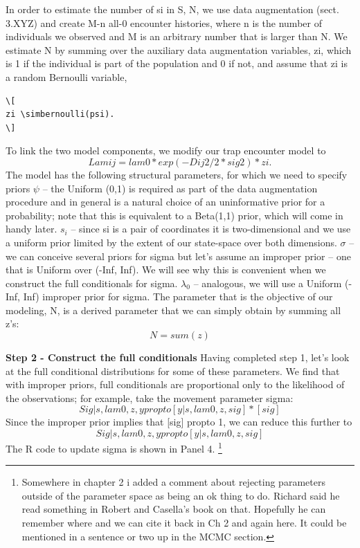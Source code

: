 In order to estimate the number of si in S, N, we use data augmentation (sect. 3.XYZ) and create M-n all-0 encounter histories, where n is the number of individuals we observed and M is an arbitrary number that is larger than N. We estimate N by summing over the auxiliary data augmentation variables, zi, which is 1 if the individual is part of the population and 0 if not, and assume that zi is a random Bernoulli variable,
\begin{verbatim}
\[
zi \simbernoulli(psi).
\]
\end{verbatim}

To link the two model components, we modify our trap encounter model to
\[
Lamij = lam0 * exp(-Dij2/2*sig2) * zi. 
\]
The model has the following structural parameters, for which we need to specify priors
$\psi$ – the Uniform (0,1) is required as part of the data augmentation procedure and in general is a natural choice of an uninformative prior for a probability; note that this is equivalent to a Beta(1,1) prior, which will come in handy later.
$s_{i}$ – since si is a pair of coordinates it is two-dimensional and we use a uniform prior limited by the extent of our state-space over both dimensions. 
$\sigma$ – we can conceive several priors for sigma but let's assume an improper prior – one that is Uniform over (-Inf, Inf). We will see why this is convenient when we construct the full conditionals for sigma.
$\lambda_{0}$ – analogous, we will use a Uniform (-Inf, Inf) improper prior for sigma.
The parameter that is the objective of our modeling, N, is a derived parameter that we can simply obtain by summing all z's:
\[
N=sum(z)
\]


{\bf Step 2 - Construct the full conditionals}
Having completed step 1, let's look at the full conditional distributions for some of these parameters.
We find that with improper priors, full conditionals are proportional only to the likelihood of the observations; for example, take the movement parameter sigma:
\[
Sig|s, lam0, z, y propto [y| s, lam0, z, sig] * [sig]
\]
Since the improper prior implies that [sig] propto 1, we can reduce this further to 
\[
Sig|s, lam0, z, y propto [y| s, lam0, z, sig]
\]
The R code to update sigma is shown in Panel 4. \footnote{ Somewhere in chapter 2 i added a comment about rejecting parameters outside of the parameter space as being an ok thing to do. Richard said he read something in Robert and Casella’s book on that. Hopefully he can remember where and we can cite it back in Ch 2 and again here.  It could be mentioned in a sentence or two up in the MCMC section.}


